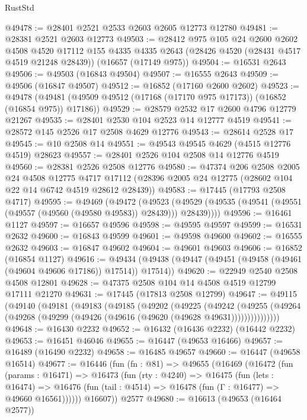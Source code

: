 \begin{lexlean}{RustStd}
\begin{coremodule}
@49478 := @28401 @2521 @2533 @2603 @2605 @12773 @12780
@49481 := @28381 @2521 @2603 @12773
@49503 := @28412
    @975
    @105
    @24
    @2600
    @2602
    @4508
    @4520
    @17112
    @155
    @4335
    @4335
    @2643
    (@28426 @4520 (@28431 @4517 @4519 @21248 @28439))
    (@16657 (@17149 @975))
@49504 := @16531 @2643
@49506 := @49503 (@16843 @49504)
@49507 := @16555 @2643
@49509 := @49506 (@16847 @49507)
@49512 := @16852 (@17160 @2600 @2602)
@49523 := @49478
    (@49481 (@49509 @49512 (@17168 (@17170 @975 @17173)) (@16852 (@16854 @975)) @17186))
@49529 := @28579 @2532 @17 @2600 @4796 @12779 @21267
@49535 := @28401 @2530 @104 @2523 @14 @12777 @4519
@49541 := @28572 @145 @2526 @17 @2508 @4629 @12776
@49543 := @28614 @2528 @17
@49545 := @10 @2508 @14
@49551 := @49543 @49545 @4629 (@4515 @12776 @4519) @28623
@49557 := @28401 @2526 @104 @2508 @14 @12776 @4519
@49560 := @28381 @2526 @2508 @12776
@49580 := @47374
    @206
    @2508
    @2005
    @24
    @4508
    @12775
    @4717
    @17112
    (@28396 @2005 @24 @12775 (@28602 @104 @22 @14 @6742 @4519 @28612 @28439))
@49583 := @17445 (@17793 @2508 @4717)
@49595 := @49469
    (@49472
      (@49523 (@49529 (@49535 (@49541 (@49551 (@49557 (@49560 (@49580 @49583)) @28439))) @28439))))
@49596 := @16461 @1127
@49597 := @16657 @49596
@49598 := @49595 @49597
@49599 := @16531 @2632
@49600 := @16843 @49599
@49601 := @49598 @49600
@49602 := @16555 @2632
@49603 := @16847 @49602
@49604 := @49601 @49603
@49606 := @16852 (@16854 @1127)
@49616 := @49434 (@49438 (@49447 (@49451 (@49458 (@49461 (@49604 @49606 @17186)) @17514)) @17514))
@49620 := @22949 @2540 @2508 @4508 @12801
@49628 := @47375 @2508 @104 @14 @4508 @4519 @12799 @17111 @21270
@49631 := @17445 (@17813 @2508 @12799)
@49647 := @49115
    (@49140
      (@49181
        (@49183
          (@49185
            (@49202
              (@49225
                (@49242
                  (@49255
                    (@49264 (@49268 (@49299 (@49426 (@49616 (@49620 (@49628 @49631)))))))))))))))
@49648 := @16430 @2232
@49652 := @16432 (@16436 @2232) (@16442 @2232)
@49653 := @16451 @46046
@49655 := @16447 (@49653 @16466)
@49657 := @16489 (@16490 @2232)
@49658 := @16485 @49657
@49660 := @16447 (@49658 @16514)
@49677 := @16446
    (fun (fn : @81) =>
    @49655
      (@16469
        (@16472
          (fun (params : @16471) =>
          @16473
            (fun (rty : @4240) =>
            @16475
              (fun (lets : @16474) =>
              @16476 (fun (tail : @4514) => @16478 (fun (Γ : @16477) => @49660 @16561))))))
        @16607))
    @2577
@49680 := @16613 (@49653 (@16464 @2577))

\end{coremodule}
\end{lexlean}
